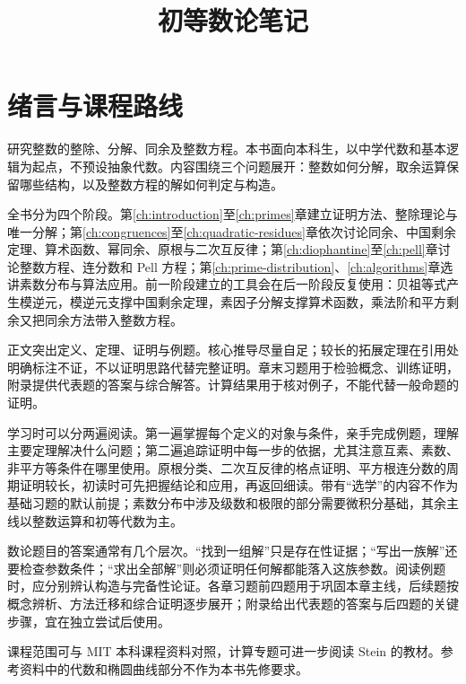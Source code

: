 \documentclass[UTF8,12pt,a4paper,fontset=fandol]{ctexbook}
\title{初等数论笔记}
\author{}
\date{}
\begin{document}
\maketitle
\frontmatter
\tableofcontents

\chapter{绪言与课程路线}
\label{ch:course-outline}

研究整数的整除、分解、同余及整数方程。本书面向本科生，以中学代数和基本逻辑为起点，不预设抽象代数。内容围绕三个问题展开：整数如何分解，取余运算保留哪些结构，以及整数方程的解如何判定与构造。

全书分为四个阶段。第\ref{ch:introduction}至\ref{ch:primes}章建立证明方法、整除理论与唯一分解；第\ref{ch:congruences}至\ref{ch:quadratic-residues}章依次讨论同余、中国剩余定理、算术函数、幂同余、原根与二次互反律；第\ref{ch:diophantine}至\ref{ch:pell}章讨论整数方程、连分数和 Pell 方程；第\ref{ch:prime-distribution}、\ref{ch:algorithms}章选讲素数分布与算法应用。前一阶段建立的工具会在后一阶段反复使用：贝祖等式产生模逆元，模逆元支撑中国剩余定理，素因子分解支撑算术函数，乘法阶和平方剩余又把同余方法带入整数方程。

正文突出定义、定理、证明与例题。核心推导尽量自足；较长的拓展定理在引用处明确标注不证，不以证明思路代替完整证明。章末习题用于检验概念、训练证明，附录提供代表题的答案与综合解答。计算结果用于核对例子，不能代替一般命题的证明。

学习时可以分两遍阅读。第一遍掌握每个定义的对象与条件，亲手完成例题，理解主要定理解决什么问题；第二遍追踪证明中每一步的依据，尤其注意互素、素数、非平方等条件在哪里使用。原根分类、二次互反律的格点证明、平方根连分数的周期证明较长，初读时可先把握结论和应用，再返回细读。带有“选学”的内容不作为基础习题的默认前提；素数分布中涉及级数和极限的部分需要微积分基础，其余主线以整数运算和初等代数为主。

数论题目的答案通常有几个层次。“找到一组解”只是存在性证据；“写出一族解”还要检查参数条件；“求出全部解”则必须证明任何解都能落入这族参数。阅读例题时，应分别辨认构造与完备性论证。各章习题前四题用于巩固本章主线，后续题按概念辨析、方法迁移和综合证明逐步展开；附录给出代表题的答案与后四题的关键步骤，宜在独立尝试后使用。

课程范围可与 MIT 本科课程资料\cite{mit-syllabus,mit-notes}对照，计算专题可进一步阅读 Stein 的教材\cite{stein-book}。参考资料中的代数和椭圆曲线部分不作为本书先修要求。

\mainmatter
\end{document}
